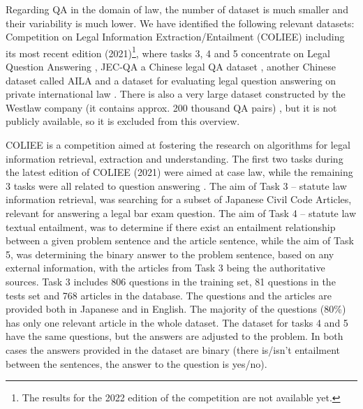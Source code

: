 Regarding QA in the domain of law, the number of dataset is much smaller and their variability is much lower. We have identified the following relevant datasets: Competition on Legal Information Extraction/Entailment (COLIEE) including its most recent edition (2021)\footnote{The results for the 2022 edition of the competition are not available yet.}, where tasks 3, 4 and 5 concentrate on Legal Question Answering \cite{rabelo2021summary}, JEC-QA a Chinese legal QA dataset \cite{zhong2019jecqa}, another Chinese dataset called AILA \cite{weiyi2020aila} and a dataset for evaluating legal question answering on private international law \cite{sovrano2021dataset}. There is also a very large dataset constructed by the Westlaw company (it contains approx.  200 thousand QA pairs) \cite{mcelvain2019westsearch}, but it is not publicly available, so it is excluded from this overview.

COLIEE is a competition aimed at fostering the research on algorithms for legal information retrieval, extraction and understanding. The first two tasks during the latest edition of COLIEE (2021) were aimed at case law, while the remaining 3 tasks were all related to question answering \cite{rabelo2021summary}. The aim of Task 3 -- statute law information retrieval, was searching for a subset of Japanese Civil Code Articles, relevant for answering a legal bar exam question.
The aim of Task 4 -- statute law textual entailment, was to determine if there exist an entailment relationship between a given problem sentence and the article sentence, while the aim of Task 5, was determining the binary answer to the problem sentence, based on any external information, with the articles from Task 3 being the authoritative sources.  Task 3 includes 806 questions in the training set, 81 questions in the tests set and 768 articles in the database. The questions and the articles are provided both in Japanese and in English. The majority of the questions (80\%) has only one relevant article in the whole dataset. The dataset for tasks 4 and 5 have the same questions, but the answers are adjusted to the problem. In both cases the answers provided in the dataset are binary
(there is/isn't entailment between the sentences, the answer to the question is yes/no).

